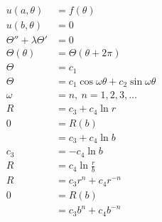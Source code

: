 \documentclass{article}
\begin{document}
\begin{align*}
  u(a, \theta)               & = f(\theta)                                                                                                \\
  u(b, \theta)               & = 0                                                                                                        \\
  \Theta'' + \lambda \Theta' & = 0                                                                                                        \\
  \Theta(\theta)             & = \Theta(\theta + 2 \pi)                                                                                   \\
  \Theta                     & = c_1                                                                                                      \\
  \Theta                     & = c_1 \cos \omega \theta + c_2 \sin \omega \theta                                                          \\
  \omega                     & = n,\ n = 1, 2, 3, \ldots                                                                                  \\
  R                          & = c_3 + c_4 \ln r                                                                                          \\
  0                          & = R(b)                                                                                                     \\
                             & = c_3 + c_4 \ln b                                                                                          \\
  c_3                        & = -c_4 \ln b                                                                                               \\
  R                          & = c_4 \ln \frac{r}{b}                                                                                      \\
  R                          & = c_3 r^n + c_4 r^{-n}                                                                                     \\
  0                          & = R(b)                                                                                                     \\
                             & = c_3 b^n + c_4 b^{-n}                                                                                     \\

\end{align*}
\end{document}
